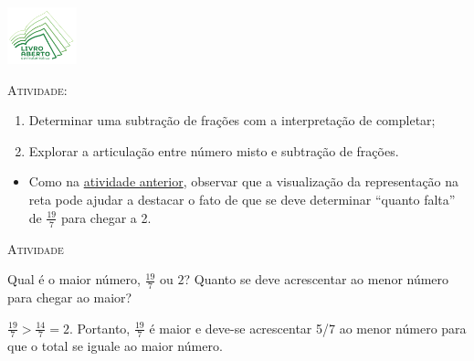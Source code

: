 \documentclass[10 pt,usenames,dvipsnames, oneside]{article}
\begin{document}
\begin{center}
  \begin{minipage}[l]{3cm}
\includegraphics[width=2cm]{../../../Figuras/logo}       
\end{minipage}\hfill
\begin{minipage}[r]{.8\textwidth}
 {\Large \scshape Atividade: }  
\end{minipage}
\end{center}
\vspace{.2cm}

\ifdefined\prof
\begin{goals}
\begin{enumerate}
    \item       Determinar uma subtração de frações com a interpretação de completar;
    \item       Explorar a articulação entre número misto e subtração de frações.
\end{enumerate}

\tcblower

\begin{itemize}
    \item       Como na \hyperref[chap5-ativ10]{atividade anterior}, observar que a visualização da representação na reta pode ajudar a destacar o fato de que se deve determinar       ``quanto falta''       de       $\frac{19}{7}$       para chegar a 2.
\end{itemize}
\end{goals}

\bigskip
\begin{center}
{\large \scshape Atividade}
\end{center}
\fi

Qual é o maior número, $\frac{19}{7}$ ou $2$? Quanto se deve acrescentar ao menor número para chegar ao maior?

\ifdefined\prof
\begin{solucao}

$\frac{19}{7} > \frac{14}{7} = 2$. Portanto, $\frac{19}{7}$ é maior e deve-se acrescentar 5/7 ao menor número para que o total se iguale ao maior número.

\end{solucao}
\fi
\end{document}
